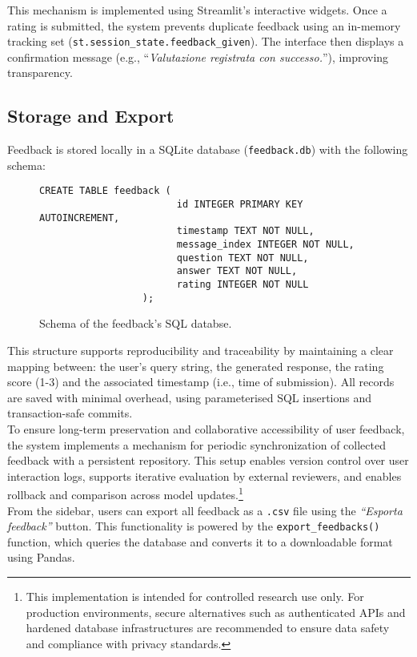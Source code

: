 \begin{spacing}{1.5}
This mechanism is implemented using Streamlit’s interactive widgets. Once a rating is submitted, the system prevents duplicate feedback using an in-memory tracking set (\texttt{st.session\_state.feedback\_given}). The interface then displays a confirmation message (e.g., ``\textit{Valutazione registrata con successo.}''), improving transparency.

\subsection{Storage and Export}
Feedback is stored locally in a SQLite database (\texttt{feedback.db}) with the following schema:

\begin{figure}[H]
\begin{Verbatim}[breaklines=true]
                  CREATE TABLE feedback (
                        id INTEGER PRIMARY KEY AUTOINCREMENT,
                        timestamp TEXT NOT NULL,
                        message_index INTEGER NOT NULL,
                        question TEXT NOT NULL,
                        answer TEXT NOT NULL,
                        rating INTEGER NOT NULL
                  );
\end{Verbatim}
\caption{Schema of the feedback's SQL databse.}\label{fig:sql_schema}
\end{figure}

This structure supports reproducibility and traceability by maintaining a clear mapping between: the user's query string, the generated response, the rating score (1-3) and the associated timestamp (i.e., time of submission). All records are saved with minimal overhead, using parameterised SQL insertions and transaction-safe commits.\\

To ensure long-term preservation and collaborative accessibility of user feedback, the system implements a mechanism for periodic synchronization of collected feedback with a persistent repository. This setup enables version control over user interaction logs, supports iterative evaluation by external reviewers, and enables rollback and comparison across model updates.\footnote{This implementation is intended for controlled research use only. For production environments, secure alternatives such as authenticated APIs and hardened database infrastructures are recommended to ensure data safety and compliance with privacy standards.}\\

From the sidebar, users can export all feedback as a \texttt{.csv} file using the \textit{``Esporta feedback''} button. This functionality is powered by the \texttt{export\_feedbacks()} function, which queries the database and converts it to a downloadable format using Pandas. 


\end{spacing}
